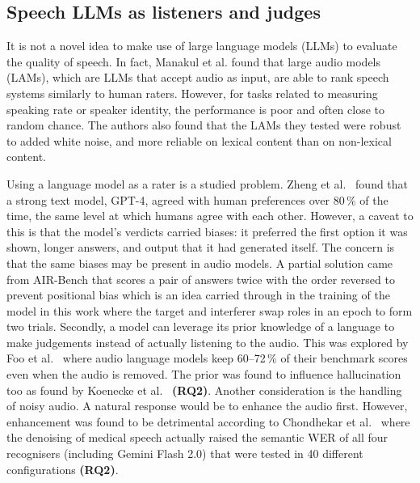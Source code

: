 \subsection{Speech LLMs as listeners and judges}
\label{sec:llms}
It is not a novel idea to make use of large language models (LLMs) to evaluate the quality of speech. In fact, Manakul et al. \cite{manakul2026audiojudge} found that large audio models (LAMs), which are LLMs that accept audio as input, are able to rank speech systems similarly to human raters. However, for tasks related to measuring speaking rate or speaker identity, the performance is poor and often close to random chance. The authors also found that the LAMs they tested were robust to added white noise, and more reliable on lexical content than on non-lexical content.

Using a language model as a rater is a studied problem. Zheng et al.\ \cite{zheng2023judging} found that a strong text model, GPT-4, agreed with human preferences over 80\,\% of the time, the same level at which humans agree with each other. However, a caveat to this is that the model's verdicts carried biases: it preferred the first option it was shown, longer answers, and output that it had generated itself. The concern is that the same biases may be present in audio models. A partial solution came from AIR-Bench \cite{yang2024airbench} that scores a pair of answers twice with the order reversed to prevent positional bias which is an idea carried through in the training of the model in this work where the target and interferer swap roles in an epoch to form two trials. Secondly, a model can leverage its prior knowledge of a language to make judgements instead of actually listening to the audio. This was explored by Foo et al.\ \cite{foo2026glitters} where audio language models keep 60--72\,\% of their benchmark scores even when the audio is removed. The prior was found to influence hallucination too as found by Koenecke et al.\ \cite{koenecke2024careless} \textbf{(RQ2)}. Another consideration is the handling of noisy audio. A natural response would be to enhance the audio first. However, enhancement was found to be detrimental according to Chondhekar et al.\ \cite{chondhekar2025denoising} where the denoising of medical speech actually raised the semantic WER of all four recognisers (including Gemini Flash 2.0) that were tested in 40 different configurations \textbf{(RQ2)}.

